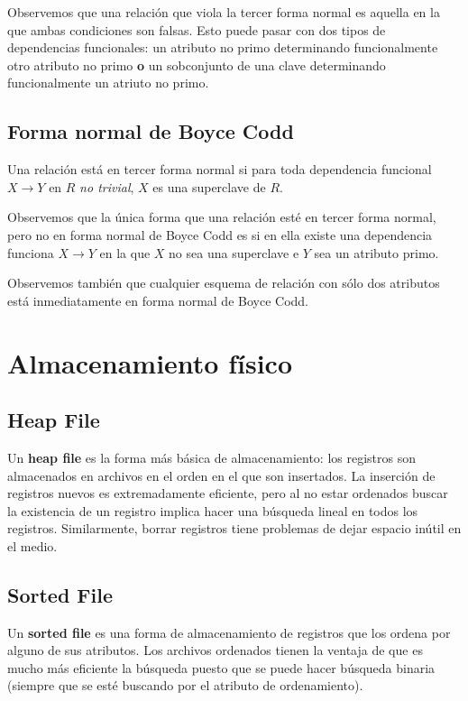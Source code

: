\documentclass[]{article}
\begin{document}
Observemos que una relación que viola la tercer forma normal es aquella en la que ambas condiciones son falsas. Esto puede pasar con dos tipos de dependencias funcionales: un atributo no primo determinando funcionalmente otro atributo no primo \textbf{o} un sobconjunto de una clave determinando funcionalmente un atriuto no primo.

\subsection{Forma normal de Boyce Codd}
Una relación está en tercer forma normal si para toda dependencia funcional $X\rightarrow Y$ en $R$ \emph{no trivial}, $X$ es una superclave de $R$.

Observemos que la única forma que una relación esté en tercer forma normal, pero no en forma normal de Boyce Codd es si en ella existe una dependencia funciona $X\rightarrow Y$ en la que $X$ no sea una superclave e $Y$ sea un atributo primo.

Observemos también que cualquier esquema de relación con sólo dos atributos está inmediatamente en forma normal de Boyce Codd.


\section{Almacenamiento físico}
\subsection{Heap File}
Un \textbf{heap file} es la forma más básica de almacenamiento: los registros son almacenados en archivos en el orden en el que son insertados. La inserción de registros nuevos es extremadamente eficiente, pero al no estar ordenados buscar la existencia de un registro implica hacer una búsqueda lineal en todos los registros. Similarmente, borrar registros tiene problemas de dejar espacio inútil en el medio.

\subsection{Sorted File}
Un \textbf{sorted file} es una forma de almacenamiento de registros que los ordena por alguno de sus atributos. Los archivos ordenados tienen la ventaja de que es mucho más eficiente la búsqueda puesto que se puede hacer búsqueda binaria (siempre que se esté buscando por el atributo de ordenamiento).
\end{document}
